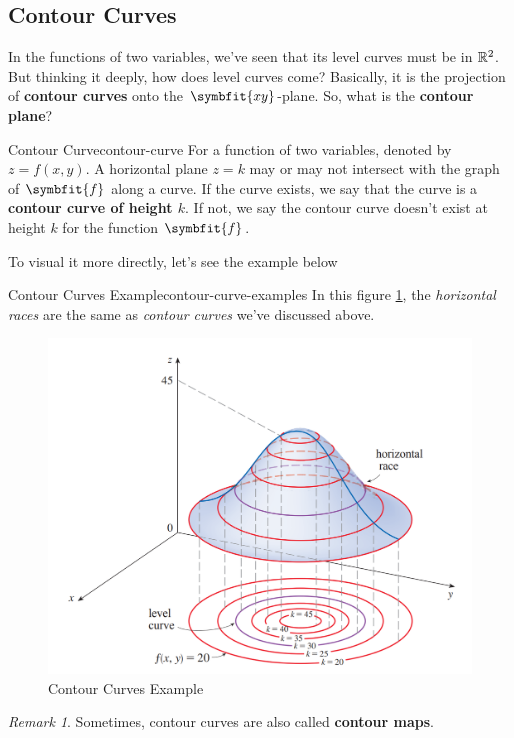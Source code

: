 \documentclass[math,code]{amznotes}
\theoremstyle{remark}
\newtheorem*{remark}{Remark}
\begin{document}
\subsection{Contour Curves}
In the functions of two variables, we've seen that its level curves must be in $\mathbb{R}^2$. But thinking it deeply, how does level curves come? Basically, it is the projection of \textbf{contour curves} onto the $\symbfit{xy}$-plane. So, what is the \textbf{contour plane}?
\begin{dfnbox}{Contour Curve}{contour-curve}
    For a function of two variables, denoted by $z=f(x,y)$. A horizontal plane $z=k$ may or may not intersect with the graph of $\symbfit{f}$ along a curve. If the curve exists, we say that the curve is a {\color{red} \textbf{contour curve of height $k$}}. If not, we say the contour curve doesn't exist at height $k$ for the function $\symbfit{f}$.
\end{dfnbox}
To visual it more directly, let's see the example below
\begin{exbox}{Contour Curves Example}{contour-curve-examples}
    In this figure \ref{fig:contour-curves-example}, the \textit{horizontal races} are the same as \textit{contour curves} we've discussed above.
    \begin{figure}[H]
        \centering
        \includegraphics[width=0.5\linewidth]{images/contour-curve-example.png}
        \caption{Contour Curves Example}
        \label{fig:contour-curves-example}
    \end{figure}
\end{exbox}
\begin{notebox}
    \begin{remark}
        Sometimes, contour curves are also called \textbf{contour maps}.
    \end{remark}
\end{notebox}
\end{document}
